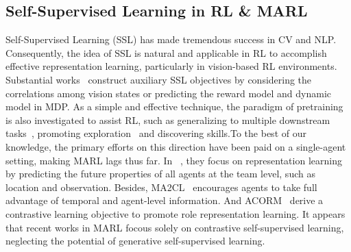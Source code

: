 \subsection{Self-Supervised Learning in RL \& MARL}
Self-Supervised Learning (SSL) has made tremendous success in CV and NLP. Consequently, the idea of SSL is natural and applicable in RL to accomplish effective representation learning, particularly in vision-based RL environments. Substantial works~\cite{laskin2020curl,zhu2022masked,yu2022mask,yu2021playvirtual,yarats2021reinforcement,liu2024enhancing} construct auxiliary SSL objectives by considering the correlations among vision states or predicting the reward model and dynamic model in MDP. As a simple and effective technique, the paradigm of pretraining is also investigated to assist RL, such as generalizing to multiple downstream tasks~\cite{liu2022masked,schwarzer2021pretraining}, promoting exploration~\cite{liu2021behavior} and discovering skills\cite{liu2021aps}.To the best of our knowledge, the primary efforts on this direction have been paid on a single-agent setting, making MARL lags thus far. In ~\cite{shang2021agent,feng2022joint}, they focus on representation learning by predicting the future properties of all agents at the team level, such as location and observation. Besides, MA2CL~\cite{song2023ma2cl} encourages agents to take full advantage of temporal and agent-level information. And ACORM~\cite{hu2023attention} derive a contrastive learning objective to promote role representation learning. It appears that recent works in MARL focous solely on contrastive self-supervised learning, neglecting the potential of generative self-supervised learning.
